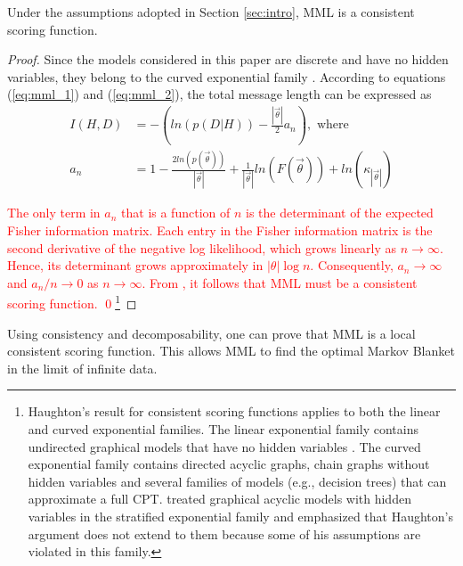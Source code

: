 \documentclass{svmult}
\begin{document}
\begin{proposition}
Under the assumptions adopted in Section \ref{sec:intro}, MML is a consistent scoring function.
\end{proposition}

\begin{proof}
  Since the models considered in this paper are discrete and have no
  hidden variables, they belong to the curved exponential
  family \cite{geiger2001stratified}. According to equations
  (\ref{eq:mml_1}) and (\ref{eq:mml_2}), the total message length
  can be expressed as
\begin{align*}
I(H, D) &= - \left(ln(p(D|H)) - \frac{|\vec{\theta}|}{2} a_n\right), \text{ where} \\
a_n &= 1 - \frac{2ln(p(\vec{\theta}))}{|\vec{\theta}|} + \frac{1}{|\vec{\theta}|} ln(F(\vec{\theta})) + ln(\kappa_{|\vec{\theta}|})
\end{align*}

\textcolor{red}{The only term in $a_n$ that is a function of $n$ is
  the determinant of the expected Fisher information matrix. Each
  entry in the Fisher information matrix is the second derivative of
  the negative log likelihood, which grows linearly as
  $n\rightarrow \infty$. Hence, its determinant grows approximately in
  $|\theta|\log n$. Consequently, $a_n \rightarrow \infty$ and
  $a_n/n \rightarrow 0$ as $n \rightarrow \infty$. From
  \citet{haughton1988choice}, it follows that MML must be a consistent
  scoring function. \qed }\footnote{Haughton's
    \citeyearpar{haughton1988choice} result for consistent scoring
      functions applies to both the linear and curved exponential
      families. The linear exponential family contains undirected
      graphical models that have no hidden variables
      \citep{geiger2001stratified}. The curved exponential family
      contains directed acyclic graphs, chain graphs without hidden
      variables and several families of models (e.g., decision trees)
      that can approximate a full CPT. \citet{geiger2001stratified}
      treated graphical acyclic models with hidden variables in the
      stratified exponential family and emphasized that Haughton's
      \citeyearpar{haughton1988choice} argument does not extend to
      them because some of his assumptions are violated in this
      family.}
\end{proof} 


Using consistency and decomposability, one can prove that MML is a local
consistent scoring function. This allows MML to find the optimal
Markov Blanket in the limit of infinite data.
\end{document}
